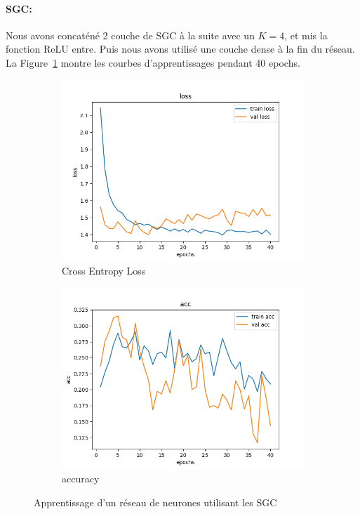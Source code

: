 \documentclass[a4paper]{article}
\begin{document}
\paragraph{SGC:}
Nous avons concaténé 2 couche de SGC à la suite avec un $K=4$, et mis la fonction ReLU entre. Puis nous avons utilisé une couche
dense à la fin du réseau. La Figure~\ref{fig: SGC} montre les courbes d'apprentissages pendant 40 epochs.

\begin{figure}[ht]
    \begin{subfigure}{0.47\textwidth}
      \includegraphics[width=\linewidth]{../results/SGC_1/loss.png}
      \caption{Cross Entropy Loss}
    \end{subfigure}
    \hfill
    \begin{subfigure}{0.47\textwidth}
      \includegraphics[width=\linewidth]{../results/SGC_1/acc.png}
      \caption{accuracy}
    \end{subfigure}
    \caption{Apprentissage d'un réseau de neurones utilisant les SGC}
    \label{fig: SGC}
\end{figure}
\end{document}
